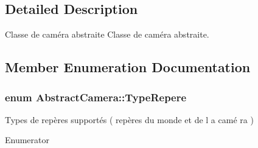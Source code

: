 \subsection{Detailed Description}
Classe de caméra abstraite Classe de caméra abstraite. 

\subsection{Member Enumeration Documentation}
\hypertarget{class_abstract_camera_a4d3cc29d2eb150eada1bb387648eae98}{
\subsubsection[{Type\+Repere}]{\setlength{\rightskip}{0pt plus 5cm}enum {\bf Abstract\+Camera\+::\+Type\+Repere}}}\label{class_abstract_camera_a4d3cc29d2eb150eada1bb387648eae98}
Types de repères supportés ( repères du monde et de l a camé ra ) \begin{Desc}
\item[Enumerator]\par
\begin{description}
\item[{\em 
\hypertarget{class_abstract_camera_a4d3cc29d2eb150eada1bb387648eae98a4136744a39efe4b86f6743eecc488eb8}{M\+O\+N\+D\+E}\label{class_abstract_camera_a4d3cc29d2eb150eada1bb387648eae98a4136744a39efe4b86f6743eecc488eb8}
}]\item[{\em 
\hypertarget{class_abstract_camera_a4d3cc29d2eb150eada1bb387648eae98a7fc33f57f9cabf6771b5fdfa9c64494c}{C\+A\+M\+E\+R\+A}\label{class_abstract_camera_a4d3cc29d2eb150eada1bb387648eae98a7fc33f57f9cabf6771b5fdfa9c64494c}
}]\end{description}
\end{Desc}


